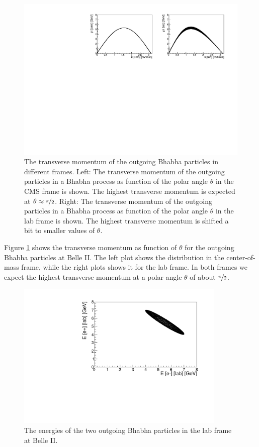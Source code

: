 \documentclass[a4paper,11pt,twosided,final,german,openbib,pdftex,listof=totoc,bibliography=totoc]{scrbook}
\begin{document}
\begin{figure}[h!]
	\centering
	\includegraphics[width=\textwidth]{Bilder/CptTheta}
	\caption[Transverse Momentum As Function Of $\theta$ In The CMS And LAB Frame]{The transverse momentum of the outgoing Bhabha particles in different frames. Left: The transverse momentum of the outgoing particles in a Bhabha process as function of the polar angle $\theta$ in the CMS frame is shown. The highest transverse momentum is expected at $\theta \approx \nicefrac{\pi}{2}$. Right: The transverse momentum of the outgoing particles in a Bhabha process as function of the polar angle $\theta$ in the lab frame is shown. The highest transverse momentum is shifted a bit to smaller values of $\theta$.}
	\label{fig:Belle IItMomentum}
\end{figure}


Figure \ref{fig:Belle IItMomentum} shows the transverse momentum as function of $\theta$ for the outgoing Bhabha particles at Belle II. The left plot shows the distribution in the center-of-mass frame, while the right plots shows it for the lab frame. In both frames we expect the highest transverse momentum at a polar angle $\theta$ of about $\nicefrac{\pi}{2}$.



\begin{figure}[h!]
	\centering
	\includegraphics[width=10cm]{Bilder/ee}
	\caption[Energies Of The Outgoing Particles In The LAB Frame]{The energies of the two outgoing Bhabha particles in the lab frame at Belle II.}
	\label{fig:EvsE}
\end{figure}
\end{document}
